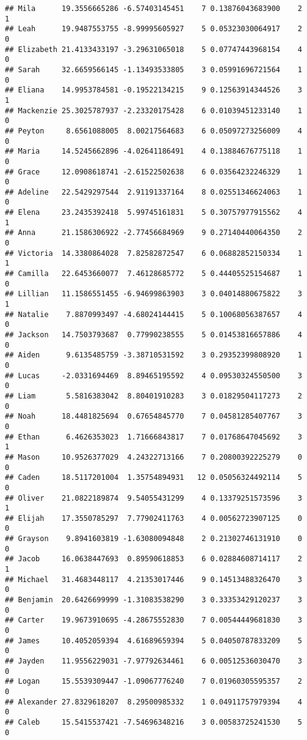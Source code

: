 \documentclass[
]{article}
\begin{document}
\begin{verbatim}
## Mila      19.3556665286 -6.57403145451    7 0.13876043683900    2    1
## Leah      19.9487553755 -8.99995605927    5 0.05323030064917    2    0
## Elizabeth 21.4133433197 -3.29631065018    5 0.07747443968154    4    0
## Sarah     32.6659566145 -1.13493533805    3 0.05991696721564    1    0
## Eliana    14.9953784581 -0.19522134215    9 0.12563914344526    3    1
## Mackenzie 25.3025787937 -2.23320175428    6 0.01039451233140    1    0
## Peyton     8.6561088005  8.00217564683    6 0.05097273256009    4    0
## Maria     14.5245662896 -4.02641186491    4 0.13884676775118    1    0
## Grace     12.0908618741 -2.61522502638    6 0.03564232246329    1    0
## Adeline   22.5429297544  2.91191337164    8 0.02551346624063    1    0
## Elena     23.2435392418  5.99745161831    5 0.30757977915562    4    1
## Anna      21.1586306922 -2.77456684969    9 0.27140440064350    2    0
## Victoria  14.3380864028  7.82582872547    6 0.06882852150334    1    1
## Camilla   22.6453660077  7.46128685772    5 0.44405525154687    1    0
## Lillian   11.1586551455 -6.94699863903    3 0.04014880675822    3    1
## Natalie    7.8870993497 -4.68024144415    5 0.10068056387657    4    0
## Jackson   14.7503793687  0.77990238555    5 0.01453816657886    4    0
## Aiden      9.6135485759 -3.38710531592    3 0.29352399808920    1    0
## Lucas     -2.0331694469  8.89465195592    4 0.09530324550500    3    0
## Liam       5.5816383042  8.80401910283    3 0.01829504117273    2    0
## Noah      18.4481825694  0.67654845770    7 0.04581285407767    3    0
## Ethan      6.4626353023  1.71666843817    7 0.01768647045692    3    1
## Mason     10.9526377029  4.24322713166    7 0.20800392225279    0    0
## Caden     18.5117201004  1.35754894931   12 0.05056324492114    5    0
## Oliver    21.0822189874  9.54055431299    4 0.13379251573596    3    1
## Elijah    17.3550785297  7.77902411763    4 0.00562723907125    0    0
## Grayson    9.8941603819 -1.63080094848    2 0.21302746131910    0    0
## Jacob     16.0638447693  0.89590618853    6 0.02884608714117    2    1
## Michael   31.4683448117  4.21353017446    9 0.14513488326470    3    0
## Benjamin  20.6426699999 -1.31083538290    3 0.33353429120237    3    0
## Carter    19.9673910695 -4.28675552830    7 0.00544449681830    3    0
## James     10.4052059394  4.61689659394    5 0.04050787833209    5    0
## Jayden    11.9556229031 -7.97792634461    6 0.00512536030470    3    0
## Logan     15.5539309447 -1.09067776240    7 0.01960305595357    2    0
## Alexander 27.8329618207  8.29500985332    1 0.04911757979394    4    0
## Caleb     15.5415537421 -7.54696348216    3 0.00583725241530    5    0

\end{verbatim}
\end{document}
